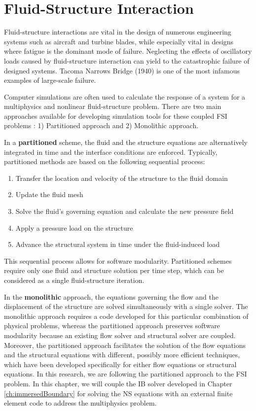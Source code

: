 \section{Fluid-Structure Interaction}
Fluid-structure interactions are vital in the design of numerous engineering systems such as aircraft and turbine blades, while especially vital in designs where fatigue is the dominant mode of failure. Neglecting the effects of oscillatory loads caused by fluid-structure interaction can yield to the catastrophic failure of designed systems. Tacoma Narrows Bridge (1940) is one of the most infamous examples of large-scale failure.

Computer simulations are often used to calculate the response of a system for a multiphysics and nonlinear fluid-structure problem. There are two main approaches available for developing simulation tools for these coupled FSI problems \cite{michler2004monolithic}: 1) Partitioned approach and 2) Monolithic approach.

In a \textbf{partitioned} scheme, the fluid and the structure equations are alternatively integrated in
time and the interface conditions are enforced. Typically, partitioned methods are based on the following sequential process:

\begin{enumerate}
	\item Transfer the location and velocity of the structure to the fluid domain
	\item Update the fluid mesh
	\item Solve the fluid's governing equation and calculate the new pressure field
	\item Apply a pressure load on the structure
	\item Advance the structural system in time under the fluid-induced load
\end{enumerate}

This sequential process allows for software modularity. Partitioned schemes require only one fluid
and structure solution per time step, which can be considered as a single fluid-structure iteration.

In the \textbf{monolithic} approach, the equations governing the flow and the displacement of the structure are solved simultaneously with a single solver. The monolithic approach requires a code developed for this particular combination of physical problems, whereas the partitioned approach preserves software modularity because an existing flow solver and structural solver are coupled. Moreover, the partitioned approach facilitates the solution of the flow equations and the structural equations with different, possibly more efficient techniques, which have been developed specifically for either flow equations or structural equations. In this research, we are following the partitioned approach to the FSI problem. In this chapter, we will couple the IB solver developed in Chapter \ref{ch:immersedBoundary} for solving the NS equations with an external finite element code to address the multiphysics problem.

